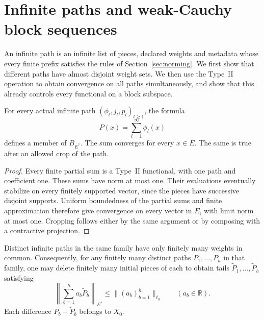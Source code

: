\section{Infinite paths and weak-Cauchy block sequences}
\label{sec:paths}

An infinite path is an infinite list of pieces, declared weights and
metadata whose every finite prefix satisfies the rules of
Section~\ref{sec:norming}.  We first show that different paths have
almost disjoint weight sets.  We then use the Type~II operation to obtain
convergence on all paths simultaneously, and show that this already
controls every functional on a block subspace.

\begin{lemma}\label{path:bounded}
For every actual infinite path $(\phi_l,j_l,p_l)_{l\ge1}$, the formula
\[
 P(x)=\sum_{l=1}^{\infty}\phi_l(x)
\]
defines a member of $B_{E^*}$.  The sum converges for every $x\in E$.
The same is true after an allowed crop of the path.
\end{lemma}

\begin{proof}
Every finite partial sum is a Type~II functional, with one path and
coefficient one.  These sums have norm at most one.  Their evaluations
eventually stabilize on every finitely supported vector, since the
pieces have successive disjoint supports.  Uniform boundedness of the
partial sums and finite approximation therefore give convergence on
every vector in $E$, with limit norm at most one.  Cropping follows
either by the same argument or by composing with a contractive
projection.
\end{proof}

\begin{lemma}\label{path:rigidity}
Distinct infinite paths in the same family have only finitely many
weights in common.  Consequently, for any finitely many distinct paths
$P_1,\ldots,P_h$ in that family, one may delete finitely many initial
pieces of each to obtain tails $\widetilde P_1,\ldots,
\widetilde P_h$ satisfying
\begin{equation}
 \left\|\sum_{b=1}^{h}a_b\widetilde P_b\right\|_{E^*}
 \le\|(a_b)_{b=1}^{h}\|_{\ell_q}
 \qquad(a_b\in\mathbb R).
 \label{path:tail-estimate}
\end{equation}
Each difference $P_b-\widetilde P_b$ belongs to $X_0$.
\end{lemma}

